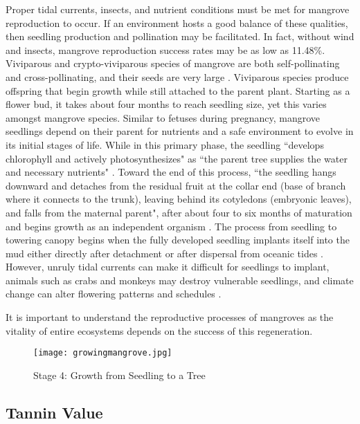   Proper tidal currents, insects, and nutrient conditions must be met for mangrove reproduction to occur. If an environment hosts a good balance of these qualities, then seedling production and pollination may be facilitated.  In fact, without wind and insects, mangrove reproduction success rates may be as low as 11.48\%. Viviparous and crypto-viviparous species of mangrove are both self-pollinating and cross-pollinating, and their seeds are very large \cite{ge1999reproductive}. Viviparous species produce offspring that begin growth while still attached to the parent plant. Starting as a flower bud, it takes about four months to reach seedling size, yet this varies amongst mangrove species. Similar to fetuses during pregnancy, mangrove seedlings depend on their parent for nutrients and a safe environment to evolve in its initial stages of life. While in this primary phase, the seedling ``develops chlorophyll and actively photosynthesizes" as ``the parent tree supplies the water and necessary nutrients" \citep{selvam2004ecology}.  Toward the end of this process, ``the seedling hangs downward and detaches from the residual fruit at the collar end (base of branch where it connects to the trunk), leaving behind its cotyledons (embryonic leaves), and falls from the maternal parent", after about four to six months of maturation and begins growth as an independent organism . The process from seedling to towering canopy begins when the fully developed seedling implants itself into the mud either directly after detachment or after dispersal from oceanic tides \citep{aluri2013reproductive}. However, unruly tidal currents can make it difficult for seedlings to implant, animals such as crabs and monkeys may destroy vulnerable seedlings, and climate change can alter flowering patterns and schedules \citep{aluri2013reproductive}.

	It is important to understand the reproductive processes of mangroves as the vitality of entire ecosystems depends on the success of this regeneration. 
	
\begin{figure}[!htb]
      \centering
        \texttt{[image: growingmangrove.jpg]}
        \caption {Stage 4: Growth from Seedling to a Tree}
        \label{fig:Mangrove_Stage4}
\end{figure}
      
\subsection{Tannin Value}

